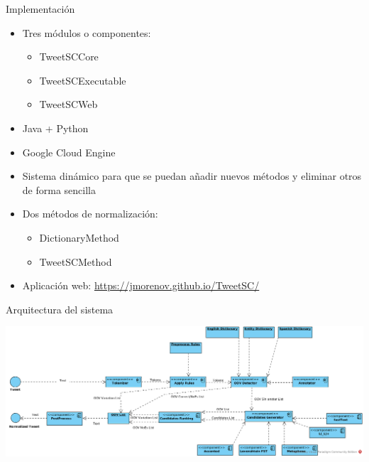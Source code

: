 \begin{tframe}{Implementaci\'on}
	\begin{itemize}
		\item Tres m\'odulos o componentes:
		\begin{itemize}
			\item TweetSCCore
			\item TweetSCExecutable
			\item TweetSCWeb
		\end{itemize}
		\item Java + Python
		\item Google Cloud Engine
		\item Sistema din\'amico para que se puedan a\~nadir nuevos m\'etodos y eliminar otros de forma sencilla
		\item Dos m\'etodos de normalizaci\'on:
		\begin{itemize}
			\item DictionaryMethod
			\item TweetSCMethod
		\end{itemize}
		\item Aplicaci\'on web: \url{https://jmorenov.github.io/TweetSC/}
	\end{itemize}
\end{tframe}

\begin{tframe}{Arquitectura del sistema}
	\begin{center}
		\includegraphics[scale=0.35]{images/DiagramaDelSistema}
	\end{center}
\end{tframe}

